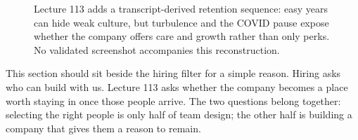 \documentclass[11pt,oneside]{book}
\begin{document}
\begin{figure}
\centering
{}
\caption{Lecture 113 adds a transcript-derived retention sequence: easy years can hide weak culture, but turbulence and the COVID pause expose whether the company offers care and growth rather than only perks. No validated screenshot accompanies this reconstruction.}
\end{figure}

This section should sit beside the hiring filter for a simple reason. Hiring asks who can build with us. Lecture 113 asks whether the company becomes a place worth staying in once those people arrive. The two questions belong together: selecting the right people is only half of team design; the other half is building a company that gives them a reason to remain.

\end{document}
